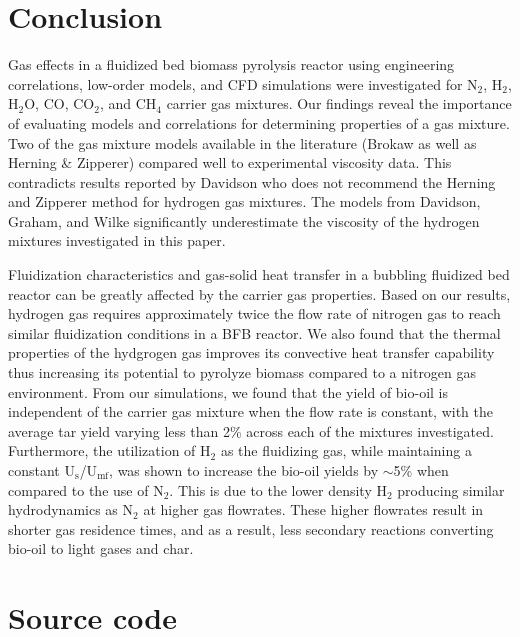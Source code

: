 \documentclass{article}
\begin{document}

\section{Conclusion}

Gas effects in a fluidized bed biomass pyrolysis reactor using engineering correlations, low-order models, and CFD simulations were investigated for N$_2$, H$_2$, H$_2$O, CO, CO$_2$, and CH$_4$ carrier gas mixtures. Our findings reveal the importance of evaluating models and correlations for determining properties of a gas mixture. Two of the gas mixture models available in the literature (Brokaw as well as Herning \& Zipperer) compared well to experimental viscosity data. This contradicts results reported by Davidson who does not recommend the Herning and Zipperer method for hydrogen gas mixtures. The models from Davidson, Graham, and Wilke significantly underestimate the viscosity of the hydrogen mixtures investigated in this paper.

Fluidization characteristics and gas-solid heat transfer in a bubbling fluidized bed reactor can be greatly affected by the carrier gas properties. Based on our results, hydrogen gas requires approximately twice the flow rate of nitrogen gas to reach similar fluidization conditions in a BFB reactor. We also found that the thermal properties of the hydgrogen gas improves its convective heat transfer capability thus increasing its potential to pyrolyze biomass compared to a nitrogen gas environment. From our simulations, we found that the yield of bio-oil is independent of the carrier gas mixture when the flow rate is constant, with the average tar yield varying less than 2\% across each of the mixtures investigated. Furthermore, the utilization of H$_2$ as the fluidizing gas, while maintaining a constant U$_\text{s}$/U$_\text{mf}$, was shown to increase the bio-oil yields by $\sim$5\% when compared to the use of N$_2$. This is due to the lower density H$_2$ producing similar hydrodynamics as N$_2$ at higher gas flowrates. These higher flowrates result in shorter gas residence times, and as a result, less secondary reactions converting bio-oil to light gases and char.


\section{Source code}
\end{document}
